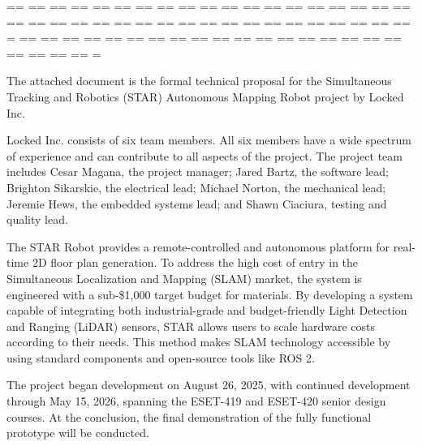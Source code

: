 \newpage

    == == == == == == == == == == == == == == == == == == == == == == == == ==
    == == == == == == == == == == == == ==
    = %
      == == == == == == == == == == == == == == == == == == == == == ==
    =
\thispagestyle {
  empty
}

\vspace*{0.3in}

The attached document is the formal technical proposal for the Simultaneous Tracking and Robotics (STAR) Autonomous Mapping Robot project by Locked Inc.

\vspace{0.2in}

Locked Inc. consists of six team members. All six members have a wide spectrum of experience and can contribute to all aspects of the project. The project team includes Cesar Magana, the project manager;
Jared Bartz, the software lead;
Brighton Sikarskie, the electrical lead;
Michael Norton, the mechanical lead;
Jeremie Hews, the embedded systems lead; and Shawn Ciaciura, testing and quality lead.

\vspace{0.2in}

The STAR Robot provides a remote-controlled and autonomous platform for real-time 2D floor plan generation. To address the high cost of entry in the Simultaneous Localization and Mapping (SLAM) market, the system is engineered with a sub-\$1,000 target budget for materials. By developing a system capable of integrating both industrial-grade and budget-friendly Light Detection and Ranging (LiDAR) sensors, STAR allows users to scale hardware costs according to their needs. This method makes SLAM technology accessible by using standard components and open-source tools like ROS 2.

\vspace{0.2in}

The project began development on August 26, 2025, with continued development through May 15, 2026, spanning the ESET-419 and ESET-420 senior design courses. At the conclusion, the final demonstration of the fully functional prototype will be conducted.

\vspace{0.2in}

